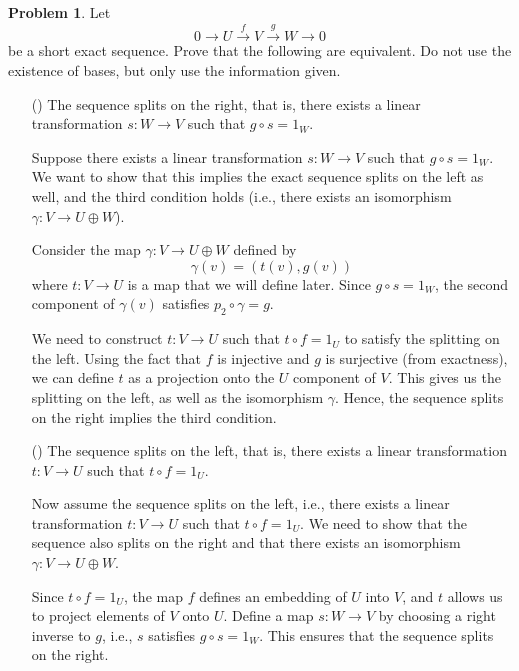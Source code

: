 \documentclass[12pt]{article}
\theoremstyle{definition}
\newtheorem{problem}{Problem}
\newcounter{subq}[problem]
\newenvironment{subproblem}
{\refstepcounter{subq} \begin{itemize} \item[(\alph{subq})]}
{\end{itemize} \medskip}
\begin{document}
\begin{problem}
    Let
    \[0 \rightarrow U \xrightarrow{f} V \xrightarrow{g} W \rightarrow 0\]
    be a short exact sequence. Prove that the following are equivalent. Do not use the existence of bases, but only use the information given.

    \begin{subproblem}
        The sequence splits on the right, that is, there exists a linear transformation $s: W \rightarrow V$ such that $g \circ s = 1_W$.

        \begin{solution}
            Suppose there exists a linear transformation $s: W \rightarrow V$ such that $g \circ s = 1_W$. We want to show that this implies the exact sequence splits on the left as well, and the third condition holds (i.e., there exists an isomorphism $\gamma: V \rightarrow U \oplus W$).

            Consider the map $\gamma: V \rightarrow U \oplus W$ defined by 
            \[
            \gamma(v) = (t(v), g(v))
            \]
            where $t: V \rightarrow U$ is a map that we will define later. Since $g \circ s = 1_W$, the second component of $\gamma(v)$ satisfies $p_2 \circ \gamma = g$.

            We need to construct $t: V \rightarrow U$ such that $t \circ f = 1_U$ to satisfy the splitting on the left. Using the fact that $f$ is injective and $g$ is surjective (from exactness), we can define $t$ as a projection onto the $U$ component of $V$. This gives us the splitting on the left, as well as the isomorphism $\gamma$. Hence, the sequence splits on the right implies the third condition.

        \end{solution}
    \end{subproblem}

    \begin{subproblem}
        The sequence splits on the left, that is, there exists a linear transformation $t: V \rightarrow U$ such that $t \circ f = 1_U$.

        \begin{solution}
            Now assume the sequence splits on the left, i.e., there exists a linear transformation $t: V \rightarrow U$ such that $t \circ f = 1_U$. We need to show that the sequence also splits on the right and that there exists an isomorphism $\gamma: V \rightarrow U \oplus W$.

            Since $t \circ f = 1_U$, the map $f$ defines an embedding of $U$ into $V$, and $t$ allows us to project elements of $V$ onto $U$. Define a map $s: W \rightarrow V$ by choosing a right inverse to $g$, i.e., $s$ satisfies $g \circ s = 1_W$. This ensures that the sequence splits on the right.


\end{solution}
\end{subproblem}
\end{problem}
\end{document}

